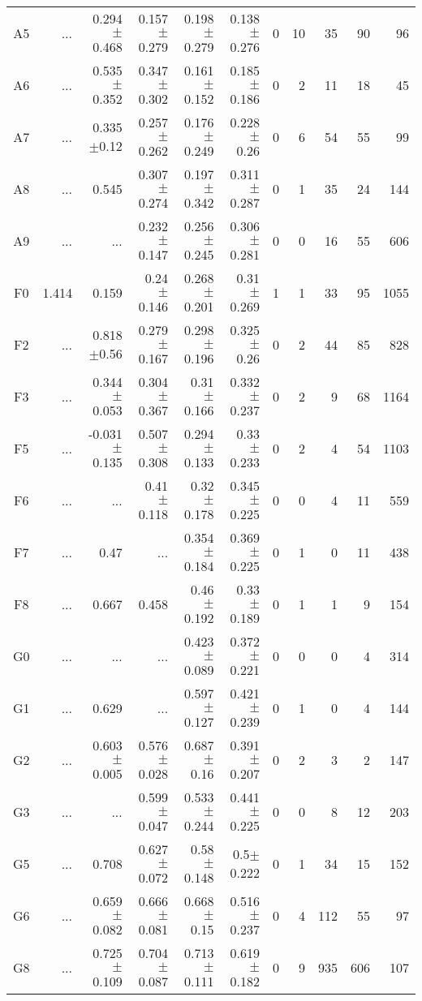 \begin{table}[t]
\begin{center}
\begin{tabular}{c|rrrrr|rrrrr}
A5	&	 ...	&	0.294$\pm$0.468	&	0.157$\pm$0.279	&	0.198$\pm$0.279	&	0.138$\pm$0.276	&	0	&	10	&	35	&	90	&	96	\\
A6	&	 ...	&	0.535$\pm$0.352	&	0.347$\pm$0.302	&	0.161$\pm$0.152	&	0.185$\pm$0.186	&	0	&	2	&	11	&	18	&	45	\\
A7	&	 ...	&	0.335$\pm$0.12	&	0.257$\pm$0.262	&	0.176$\pm$0.249	&	0.228$\pm$0.26	&	0	&	6	&	54	&	55	&	99	\\
A8	&	 ...	&	0.545	&	0.307$\pm$0.274	&	0.197$\pm$0.342	&	0.311$\pm$0.287	&	0	&	1	&	35	&	24	&	144	\\
A9	&	 ...	&	 ...	&	0.232$\pm$0.147	&	0.256$\pm$0.245	&	0.306$\pm$0.281	&	0	&	0	&	16	&	55	&	606	\\
F0	&	1.414	&	0.159	&	0.24$\pm$0.146	&	0.268$\pm$0.201	&	0.31$\pm$0.269	&	1	&	1	&	33	&	95	&	1055	\\
F2	&	 ...	&	0.818$\pm$0.56	&	0.279$\pm$0.167	&	0.298$\pm$0.196	&	0.325$\pm$0.26	&	0	&	2	&	44	&	85	&	828	\\
F3	&	 ...	&	0.344$\pm$0.053	&	0.304$\pm$0.367	&	0.31$\pm$0.166	&	0.332$\pm$0.237	&	0	&	2	&	9	&	68	&	1164	\\
F5	&	 ...	&	-0.031$\pm$0.135	&	0.507$\pm$0.308	&	0.294$\pm$0.133	&	0.33$\pm$0.233	&	0	&	2	&	4	&	54	&	1103	\\
F6	&	 ...	&	 ...	&	0.41$\pm$0.118	&	0.32$\pm$0.178	&	0.345$\pm$0.225	&	0	&	0	&	4	&	11	&	559	\\
F7	&	 ...	&	0.47	&	 ...	&	0.354$\pm$0.184	&	0.369$\pm$0.225	&	0	&	1	&	0	&	11	&	438	\\
F8	&	 ...	&	0.667	&	0.458	&	0.46$\pm$0.192	&	0.33$\pm$0.189	&	0	&	1	&	1	&	9	&	154	\\
G0	&	 ...	&	 ...	&	 ...	&	0.423$\pm$0.089	&	0.372$\pm$0.221	&	0	&	0	&	0	&	4	&	314	\\
G1	&	 ...	&	0.629	&	 ...	&	0.597$\pm$0.127	&	0.421$\pm$0.239	&	0	&	1	&	0	&	4	&	144	\\
G2	&	 ...	&	0.603$\pm$0.005	&	0.576$\pm$0.028	&	0.687$\pm$0.16	&	0.391$\pm$0.207	&	0	&	2	&	3	&	2	&	147	\\
G3	&	 ...	&	 ...	&	0.599$\pm$0.047	&	0.533$\pm$0.244	&	0.441$\pm$0.225	&	0	&	0	&	8	&	12	&	203	\\
G5	&	 ...	&	0.708	&	0.627$\pm$0.072	&	0.58$\pm$0.148	&	0.5$\pm$0.222	&	0	&	1	&	34	&	15	&	152	\\
G6	&	 ...	&	0.659$\pm$0.082	&	0.666$\pm$0.081	&	0.668$\pm$0.15	&	0.516$\pm$0.237	&	0	&	4	&	112	&	55	&	97	\\
G8	&	 ...	&	0.725$\pm$0.109	&	0.704$\pm$0.087	&	0.713$\pm$0.111	&	0.619$\pm$0.182	&	0	&	9	&	935	&	606	&	107	\\

\end{tabular}
\end{center}
\end{table}
